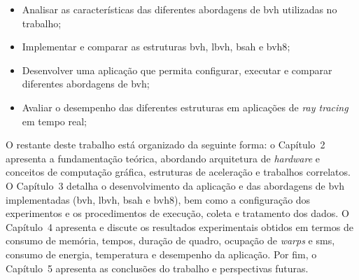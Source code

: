\begin{itemize}
    \item Analisar as características das diferentes abordagens de \gls{bvh} utilizadas no trabalho;
    \item Implementar e comparar as estruturas \gls{bvh}, \gls{lbvh}, \gls{bsah} e \gls{bvh8};
    \item Desenvolver uma aplicação que permita configurar, executar e comparar diferentes abordagens de \gls{bvh};
    \item Avaliar o desempenho das diferentes estruturas em aplicações de \textit{ray tracing} em tempo real;
\end{itemize}

O restante deste trabalho está organizado da seguinte forma: o Capítulo~2 apresenta a fundamentação teórica, abordando arquitetura de \textit{hardware} e conceitos de computação gráfica, estruturas de aceleração e trabalhos correlatos. O Capítulo~3 detalha o desenvolvimento da aplicação e das abordagens de \gls{bvh} implementadas (\gls{bvh}, \gls{lbvh}, \gls{bsah} e \gls{bvh8}), bem como a configuração dos experimentos e os procedimentos de execução, coleta e tratamento dos dados. O Capítulo~4 apresenta e discute os resultados experimentais obtidos em termos de consumo de memória, tempos, duração de quadro, ocupação de \textit{warps} e \glspl{sm}, consumo de energia, temperatura e desempenho da aplicação. Por fim, o Capítulo~5 apresenta as conclusões do trabalho e perspectivas futuras.
